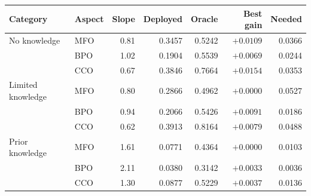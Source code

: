 \begin{tabular}{llrrrrr}
\toprule
    \textbf{Category} & \textbf{Aspect} & \textbf{Slope} & \textbf{Deployed} & \textbf{Oracle} & \textbf{Best gain} & \textbf{Needed} \\
\midrule
    No knowledge & MFO & 0.81 & 0.3457 & 0.5242 & $+0.0109$ & 0.0366 \\
     & BPO & 1.02 & 0.1904 & 0.5539 & $+0.0069$ & 0.0244 \\
     & CCO & 0.67 & 0.3846 & 0.7664 & $+0.0154$ & 0.0353 \\
\midrule
    Limited knowledge & MFO & 0.80 & 0.2866 & 0.4962 & $+0.0000$ & 0.0527 \\
     & BPO & 0.94 & 0.2066 & 0.5426 & $+0.0091$ & 0.0186 \\
     & CCO & 0.62 & 0.3913 & 0.8164 & $+0.0079$ & 0.0488 \\
\midrule
    Prior knowledge & MFO & 1.61 & 0.0771 & 0.4364 & $+0.0000$ & 0.0103 \\
     & BPO & 2.11 & 0.0380 & 0.3142 & $+0.0033$ & 0.0036 \\
     & CCO & 1.30 & 0.0877 & 0.5229 & $+0.0037$ & 0.0136 \\
\bottomrule
\end{tabular}
